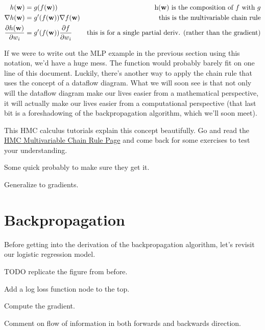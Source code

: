 \documentclass[assignment06_Solutions]{subfiles}
\begin{document}
\begin{align}
h(\mathbf{w}) &= g(f(\mathbf{w}))&\mbox{h($\mathbf{w}$) is the composition of $f$ with $g$} \nonumber \\
\nabla h(\mathbf{w}) &= g'(f(\mathbf{w})) \nabla f(\mathbf{w}) & \mbox{this is the multivariable chain rule} \\
\frac{\partial h(\mathbf{w})}{\partial w_i} &= g'(f(\mathbf{w})) \frac{\partial f}{\partial w_i}& \mbox{this is for a single partial deriv. (rather than the gradient)}
\end{align}

If we were to write out the MLP example in the previous section using this notation, we'd have a huge mess.  The function would probably barely fit on one line of this document.  Luckily, there's another way to apply the chain rule that uses the concept of a dataflow diagram.  What we will soon see is that not only will the dataflow diagram make our lives easier from a mathematical perspective, it will actually make our lives easier from a computational perspective (that last bit is a foreshadowing of the backpropagation algorithm, which we'll soon meet).


\begin{externalresources}[(20 minutes)]
This HMC calculus tutorials explain this concept beautifully.  Go and read the \href{https://www.math.hmc.edu/calculus/tutorials/multichainrule/}{HMC Multivariable Chain Rule Page} and come back for some exercises to test your understanding.
\end{externalresources}

\begin{exercise}
\bes
\item Some quick probably to make sure they get it.
\item Generalize to gradients.
\ees
\end{exercise}


\section{Backpropagation}

Before getting into the derivation of the backpropagation algorithm, let's revisit our logistic regression model.

TODO replicate the figure from before.

\begin{exercise}
\bes
\item Add a log loss function node to the top.
\item Compute the gradient.
\item Comment on flow of information in both forwards and backwards direction.
\ees
\end{exercise}
\end{document}
